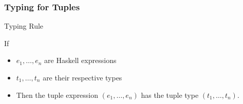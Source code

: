 \documentclass{beamer}
\begin{document}
\begin{frame}
  \frametitle{Typing for Tuples}
  \begin{block}{Typing Rule}
    \begin{mathpar}
    \end{mathpar}
    If
    \begin{itemize}
    \item $e_1, \dots, e_n$ are Haskell expressions
    \item $t_1, \dots, t_n$ are their respective types
    \item Then the tuple expression $(e_1, \dots, e_n)$ has the tuple
      type $(t_1, \dots, t_n)$.
    \end{itemize}
  \end{block}
\end{frame}
\end{document}
